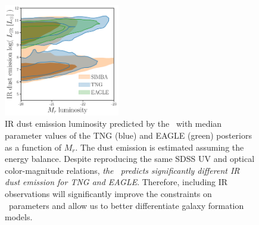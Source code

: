 


\begin{figure}
\begin{center}
    \includegraphics[width=0.45\textwidth]{figs/abc_Lir.pdf}
    \caption{\label{fig:lir}
    IR dust emission luminosity predicted by the \eda~with median parameter
    values of the TNG (blue) and EAGLE (green) posteriors as a function of
    $M_r$. The dust emission is estimated assuming the \cite{dacunha2008}
    energy balance.  Despite reproducing the same SDSS UV and optical
    color-magnitude relations, \emph{the \eda~predicts significantly different
    IR dust emission for TNG and EAGLE}. Therefore, including IR
    observations will significantly improve the constraints on \eda~parameters
    and allow us to better differentiate galaxy formation models.
    }
\end{center}
\end{figure}

